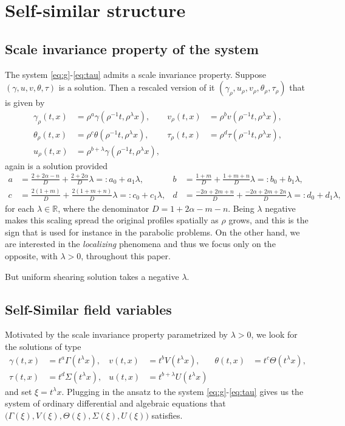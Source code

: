 \documentclass[a4paper,11pt]{article}
\begin{document}
\section{Self-similar structure}

\subsection{Scale invariance property of the system}
The system \eqref{eq:g}-\eqref{eq:tau} admits a scale invariance property. Suppose $(\gamma,u,v,\theta,\tau)$ is a solution. Then a rescaled version of it $(\gamma_\rho,u_\rho,v_\rho,\theta_\rho,\tau_\rho)$ that is given by
\begin{align*}
 \gamma_\rho(t,x) &= \rho^a\gamma(\rho^{-1}t,\rho^\lambda x), &
 v_\rho(t,x) &= \rho^bv(\rho^{-1}t,\rho^\lambda x),\\
 \theta_\rho(t,x) &= \rho^c\theta(\rho^{-1}t,\rho^\lambda x), &
 \tau_\rho(t,x) &= \rho^d\tau(\rho^{-1}t,\rho^\lambda x),\\
 u_\rho(t,x) &= \rho^{b+\lambda}\gamma(\rho^{-1}t,\rho^\lambda x),
\end{align*}
again is a solution provided
\begin{align*}
 a&= \frac{2+2\alpha-n}{D} + \frac{2+2\alpha}{D}\lambda =: a_0 + a_1 \lambda, & b&=\frac{1+m}{D} + \frac{1+m+n}{D}\lambda =: b_0 + b_1\lambda,\\
 c&=\frac{2(1+m)}{D} + \frac{2(1+m+n)}{D}\lambda =: c_0 + c_1\lambda, & d&=\frac{-2\alpha + 2m +n}{D} + \frac{-2\alpha+2m+2n}{D}\lambda =: d_0 + d_1\lambda,
\end{align*}
for each $\lambda \in \mathbb{R}$, where the denominator $D = 1+2\alpha-m-n$. Being $\lambda$ negative makes this scaling spread the original profiles spatially as $\rho$ grows, and this is the sign that is used for instance in the parabolic problems. On the other hand, we are interested in the {\it localizing} phenomena and thus we focus only on the opposite, with $\lambda>0$, throughout this paper.

 But uniform shearing solution takes a negative $\lambda$.
\subsection{Self-Similar field variables}
Motivated by the scale invariance property parametrized by $\lambda>0$, we look for the solutions of type
\begin{align*}
 \gamma(t,x) &= t^a\Gamma(t^\lambda x), & v(t,x) &= t^b V(t^\lambda x), &\theta(t,x) &= t^c \Theta(t^\lambda x),\\
 \tau(t,x) &= t^d \Sigma(t^\lambda x), & u(t,x) &= t^{b+\lambda} U(t^\lambda x)
\end{align*}
and set $\xi = t^\lambda x$. Plugging in the ansatz to the system \eqref{eq:g}-\eqref{eq:tau} gives us the system of ordinary differential and algebraic equations that $\big(\Gamma(\xi), V(\xi), \Theta(\xi), \Sigma(\xi), U(\xi)\big)$ satisfies.
\end{document}
